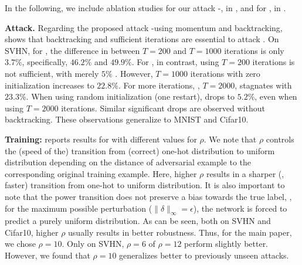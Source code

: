 In the following, we include ablation studies for our attack \PGD-\FConf, in , and for \ConfTrain, in .

\textbf{Attack.}
%
Regarding the proposed attack \PGD-\FConf using momentum and backtracking,  shows that backtracking and sufficient iterations are essential to attack \ConfTrain. On SVHN, for \AdvTrain, the difference in \RTE between $T=200$ and $T=1000$ iterations is only $3.7\%$, specifically, $46.2\%$ and $49.9\%$. For \ConfTrain, in contrast, using $T=200$ iterations is not sufficient, with merely $5\%$ \RTE. However, $T=1000$ iterations with zero initialization increases \RTE to $22.8\%$. For more iterations, \ie, $T = 2000$, \RTE stagnates with $23.3\%$. When using random initialization (one restart), \RTE drops to $5.2\%$, even when using $T = 2000$ iterations. Similar significant drops are observed without backtracking. These observations generalize to MNIST and Cifar10.

\textbf{Training:}
%
 reports results for \ConfTrain with different values for $\rho$. We note that $\rho$ controls the (speed of the) transition from (correct) one-hot distribution to uniform distribution depending on the distance of adversarial example to the corresponding original training example. Here, higher $\rho$ results in a sharper (\ie, faster) transition from one-hot to uniform distribution. It is also important to note that the power transition does not preserve a bias towards the true label, \ie, for the maximum possible perturbation ($\|\delta\|_\infty = \epsilon$), the network is forced to predict a purely uniform distribution. As can be seen, both on SVHN and Cifar10, higher $\rho$ usually results in better robustness. Thus, for the main paper, we chose $\rho = 10$. Only on SVHN, $\rho = 6$ of $\rho = 12$ perform slightly better. However, we found that $\rho = 10$ generalizes better to previously unseen attacks.

